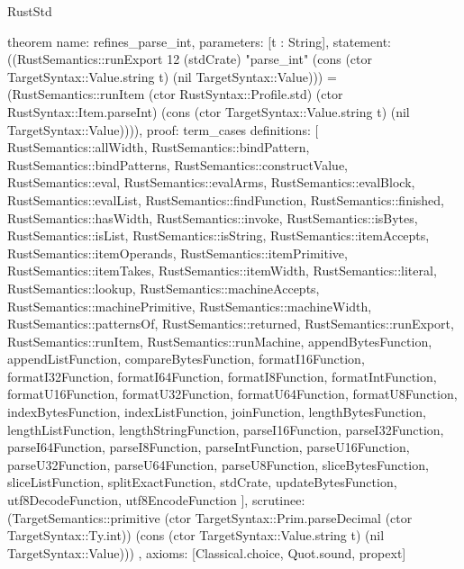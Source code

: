 \begin{lexlean}{RustStd}
\begin{semanticmodule}
theorem{
  name: refines_parse_int,
  parameters: [t : String],
  statement: ((RustSemantics::runExport 12 (stdCrate) "parse_int" (cons (ctor TargetSyntax::Value.string t) (nil TargetSyntax::Value))) = (RustSemantics::runItem (ctor RustSyntax::Profile.std) (ctor RustSyntax::Item.parseInt) (cons (ctor TargetSyntax::Value.string t) (nil TargetSyntax::Value)))),
  proof: term_cases{
    definitions: [
      RustSemantics::allWidth,
      RustSemantics::bindPattern,
      RustSemantics::bindPatterns,
      RustSemantics::constructValue,
      RustSemantics::eval,
      RustSemantics::evalArms,
      RustSemantics::evalBlock,
      RustSemantics::evalList,
      RustSemantics::findFunction,
      RustSemantics::finished,
      RustSemantics::hasWidth,
      RustSemantics::invoke,
      RustSemantics::isBytes,
      RustSemantics::isList,
      RustSemantics::isString,
      RustSemantics::itemAccepts,
      RustSemantics::itemOperands,
      RustSemantics::itemPrimitive,
      RustSemantics::itemTakes,
      RustSemantics::itemWidth,
      RustSemantics::literal,
      RustSemantics::lookup,
      RustSemantics::machineAccepts,
      RustSemantics::machinePrimitive,
      RustSemantics::machineWidth,
      RustSemantics::patternsOf,
      RustSemantics::returned,
      RustSemantics::runExport,
      RustSemantics::runItem,
      RustSemantics::runMachine,
      appendBytesFunction,
      appendListFunction,
      compareBytesFunction,
      formatI16Function,
      formatI32Function,
      formatI64Function,
      formatI8Function,
      formatIntFunction,
      formatU16Function,
      formatU32Function,
      formatU64Function,
      formatU8Function,
      indexBytesFunction,
      indexListFunction,
      joinFunction,
      lengthBytesFunction,
      lengthListFunction,
      lengthStringFunction,
      parseI16Function,
      parseI32Function,
      parseI64Function,
      parseI8Function,
      parseIntFunction,
      parseU16Function,
      parseU32Function,
      parseU64Function,
      parseU8Function,
      sliceBytesFunction,
      sliceListFunction,
      splitExactFunction,
      stdCrate,
      updateBytesFunction,
      utf8DecodeFunction,
      utf8EncodeFunction
    ],
    scrutinee: (TargetSemantics::primitive (ctor TargetSyntax::Prim.parseDecimal (ctor TargetSyntax::Ty.int)) (cons (ctor TargetSyntax::Value.string t) (nil TargetSyntax::Value)))
  },
  axioms: [Classical.choice, Quot.sound, propext]
}


\end{semanticmodule}
\end{lexlean}
